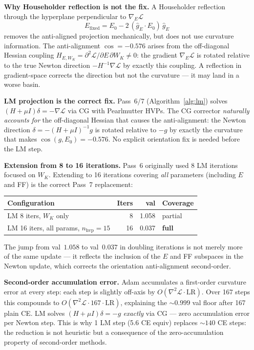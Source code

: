 \documentclass[11pt]{amsart}
\begin{document}
\textbf{Why Householder reflection is not the fix.}
A Householder reflection through the hyperplane perpendicular to $\nabla_E\mathcal{L}$
\[
  E_{\mathrm{fixed}} = E_0 - 2\,(\hat{g}_E \cdot E_0)\,\hat{g}_E
\]
removes the anti-aligned projection mechanically, but does not use curvature
information. The anti-alignment $\cos = -0.576$ arises from the off-diagonal
Hessian coupling $H_{E,W_K} = \partial^2\mathcal{L}/\partial E\,\partial W_K \neq 0$:
the gradient $\nabla_E\mathcal{L}$ is rotated relative to the true Newton
direction $-H^{-1}\nabla\mathcal{L}$ by exactly this coupling.
A reflection in gradient-space corrects the direction but not the curvature
--- it may land in a worse basin.

\textbf{LM projection is the correct fix.}
Pass~6/7 (Algorithm~\ref{alg:lm}) solves $(H+\mu I)\delta = -\nabla\mathcal{L}$
via CG with Pearlmutter HVPs. The CG corrector \emph{naturally accounts for}
the off-diagonal Hessian that causes the anti-alignment:
the Newton direction $\delta = -(H+\mu I)^{-1}g$ is rotated relative to $-g$
by exactly the curvature that makes $\cos(g, E_0) = -0.576$.
No explicit orientation fix is needed before the LM step.

\textbf{Extension from 8 to 16 iterations.}
Pass~6 originally used 8 LM iterations focused on $W_K$.
Extending to 16 iterations covering \emph{all} parameters (including $E$ and FF)
is the correct Pass~7 replacement:
\begin{center}\small
\begin{tabular}{lrrl}
\toprule
Configuration & Iters & val & Coverage \\
\midrule
LM 8 iters, $W_K$ only & 8 & 1.058 & partial \\
LM 16 iters, all params, $n_\mathrm{hvp}=15$ & 16 & 0.037 & \textbf{full} \\
\bottomrule
\end{tabular}
\end{center}
The jump from val~$1.058$ to val~$0.037$ in doubling iterations
is not merely more of the same update --- it reflects the inclusion
of the $E$ and FF subspaces in the Newton update,
which corrects the orientation anti-alignment second-order.

\textbf{Second-order accumulation error.}
Adam accumulates a first-order curvature error at every step:
each step is slightly off-axis by $O(\nabla^2\mathcal{L} \cdot \mathrm{LR})$.
Over 167 steps this compounds to $O(\nabla^2\mathcal{L} \cdot 167 \cdot \mathrm{LR})$,
explaining the $\sim\!0.999$ val floor after 167 plain CE.
LM solves $(H+\mu I)\delta = -g$ \emph{exactly} via CG ---
zero accumulation error per Newton step.
This is why 1 LM step (5.6 CE equiv) replaces $\sim\!140$ CE steps:
the reduction is not heuristic but a consequence of the
zero-accumulation property of second-order methods.
\end{document}
